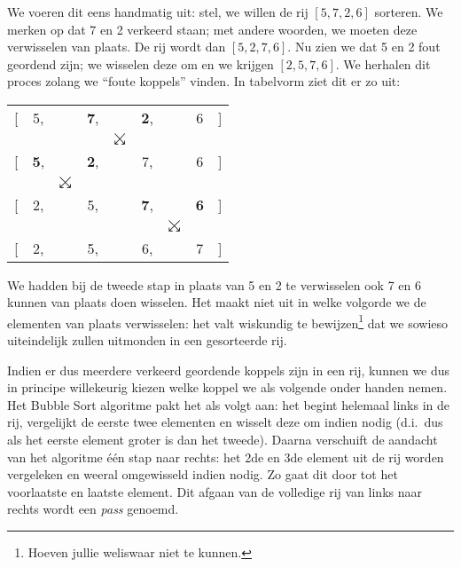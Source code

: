 \begin{example}
We voeren dit eens handmatig uit: stel, we willen de rij $[5, 7, 2, 6]$ sorteren.
We merken op dat 7 en 2 verkeerd staan;
met andere woorden, we moeten deze verwisselen van plaats. De rij wordt dan $[5, 2, 7, 6]$.
Nu zien we dat 5 en 2 fout geordend zijn;
we wisselen deze om en we krijgen $[2, 5, 7, 6]$. We herhalen dit proces zolang we
``foute koppels'' vinden. In tabelvorm ziet
dit er zo uit:

{
\newcommand{\HL}[1]{\textbf{#1}}
\newcommand{\swap}{\ensuremath{\searrow\kern-10pt\swarrow}}
\begin{center}
  \begin{tabular}{rcccccccl}
    {[} & 5, && \HL7, && \HL2, && 6 & ] \\
    &&&& \swap \\
    {[} & \HL5, && \HL2, && 7, && 6 & ] \\
    && \swap \\
    {[} & 2, && 5, && \HL7, && \HL6 & ] \\
    &&&&&& \swap \\
    {[} & 2, && 5, && 6, && 7 & ] \\
  \end{tabular}
\end{center}
}
We hadden bij de tweede stap in plaats van 5 en 2 te verwisselen ook 7 en 6 kunnen van plaats doen wisselen.
Het maakt niet uit in welke volgorde we de elementen van plaats verwisselen: het valt wiskundig
te bewijzen\footnote{Hoeven jullie weliswaar niet te kunnen.} dat we sowieso uiteindelijk
zullen uitmonden in een gesorteerde rij.
\end{example}

Indien er dus meerdere verkeerd geordende koppels zijn in een rij,
kunnen we dus in principe willekeurig kiezen welke koppel we
als volgende onder handen nemen. Het Bubble Sort algoritme pakt het
als volgt aan: het begint helemaal links in de rij, vergelijkt de eerste twee elementen en
wisselt deze om indien nodig (d.i.\ dus als het eerste element groter is dan het tweede).
Daarna verschuift de aandacht van het algoritme
\'e\'en stap naar rechts: het 2de en 3de element uit de rij worden vergeleken en weeral
omgewisseld indien nodig. Zo gaat dit door
tot het voorlaatste en laatste element. Dit afgaan van de volledige rij van links
naar rechts wordt een \emph{pass} genoemd.

